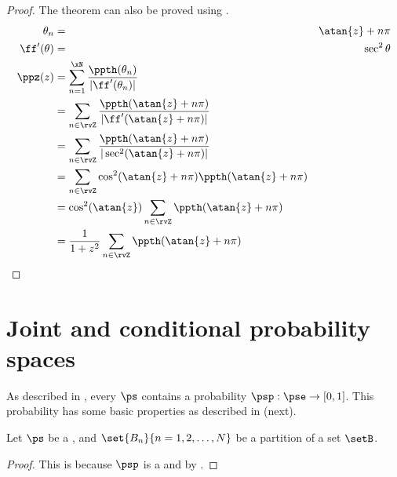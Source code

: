 \begin{proof}
The theorem can also be proved using .
\begin{align*}
  \theta_n &=& \atan{z}+n\pi \\
  \ff'(\theta) &=& \sec^2 \theta    \\
  \ppz(z)
    &= \sum_{n=1}^{\xN} \frac{\ppth(\theta_n)}{|\ff'(\theta_n)|}
  \\&= \sum_{n\in\rvZ}\frac{\ppth(\atan{z}+n\pi)}{|\ff'(\atan{z}+n\pi)|}
  \\&= \sum_{n\in\rvZ}\frac{\ppth(\atan{z}+n\pi)}{|\sec^2(\atan{z}+n\pi)|}
  \\&= \sum_{n\in\rvZ}\cos^2(\atan{z}+n\pi)  \ppth(\atan{z}+n\pi)
  \\&= \cos^2(\atan{z}) \sum_{n\in\rvZ} \ppth(\atan{z}+n\pi)
  \\&= \frac{1}{1+z^2}  \sum_{n\in\rvZ}\ppth(\atan{z}+n\pi)
\end{align*}
\end{proof}

\section{Joint and conditional probability spaces}
As described in ,
every  $\ps$ contains a probability  $\psp:\pse\to[0,1]$.
This probability  has some basic properties as described in
 (next).
\begin{theorem}
\label{thm:P}
Let $\ps$ be a ,
and $\set{B_n}{n=1,2,\ldots,N}$ be a partition of a set $\setB$.
\end{theorem}
\begin{proof}
This is because $\psp$ is a  and by .
\end{proof}



